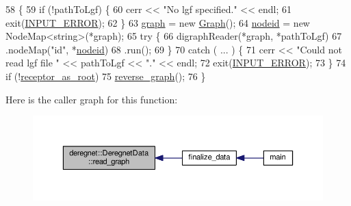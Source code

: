 \begin{DoxyCode}
58                                                \{
59     \textcolor{keywordflow}{if} (!pathToLgf) \{
60         cerr << \textcolor{stringliteral}{"No lgf specified."} << endl;
61         exit(\hyperlink{DeregnetData_8h_a288116f92845fddefeb044f5b84bc889}{INPUT\_ERROR});
62     \}
63     \hyperlink{classderegnet_1_1DeregnetData_ab76d30fa2ef87099faecb31e3f95b6d6}{graph} = \textcolor{keyword}{new} \hyperlink{namespacederegnet_a55b76c55bbabc682cbc61f8b9948799e}{Graph}();
64     \hyperlink{classderegnet_1_1DeregnetData_a3b57d7ed19c104c7fe257e17f0d2cfb5}{nodeid} = \textcolor{keyword}{new} NodeMap<string>(*graph);
65     \textcolor{keywordflow}{try} \{
66         digraphReader(*graph, *pathToLgf)
67         .nodeMap(\textcolor{stringliteral}{"id"}, *\hyperlink{classderegnet_1_1DeregnetData_a3b57d7ed19c104c7fe257e17f0d2cfb5}{nodeid})
68         .run();
69     \}
70     \textcolor{keywordflow}{catch} ( ... ) \{
71         cerr << \textcolor{stringliteral}{"Could not read lgf file "} << pathToLgf << \textcolor{stringliteral}{"."} << endl;
72         exit(\hyperlink{DeregnetData_8h_a288116f92845fddefeb044f5b84bc889}{INPUT\_ERROR});
73     \}
74     \textcolor{keywordflow}{if} (!\hyperlink{classderegnet_1_1DeregnetData_ae7936fe59661a68464134b9251303727}{receptor\_as\_root})
75         \hyperlink{classderegnet_1_1DeregnetData_aa36e9ddbc2d055ac7661e74f8fa76da4}{reverse\_graph}();
76 \}
\end{DoxyCode}


Here is the caller graph for this function\+:\nopagebreak
\begin{figure}[H]
\begin{center}
\leavevmode
\includegraphics[width=350pt]{classderegnet_1_1DeregnetData_ae5edd8f077b20056f416d42ef3fb03d2_icgraph}
\end{center}
\end{figure}


